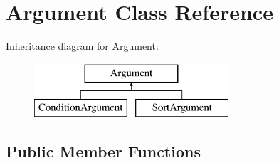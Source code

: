 \hypertarget{classArgument}{\section{Argument Class Reference}
\label{classArgument}
}
Inheritance diagram for Argument\+:\begin{figure}[H]
\begin{center}
\leavevmode
\includegraphics[height=2.000000cm]{classArgument}
\end{center}
\end{figure}
\subsection*{Public Member Functions}
